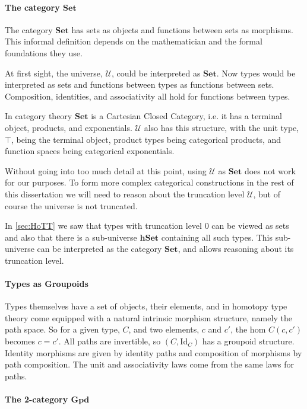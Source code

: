 \documentclass[12pt, parskip, DIV=14]{scrbook}
\newcommand{\hSet}{\mathbf{hSet}}
\newcommand{\Gpd}{\mathbf{Gpd}}
\begin{document}
\paragraph{The category $\mathbf{Set}$}

The category $\mathbf{Set}$ has sets as objects and functions between sets as morphisms. This informal definition depends on the mathematician and the formal foundations they use.

At first sight, the universe, $\mathcal{U}$, could be interpreted as $\mathbf{Set}$. Now types would be interpreted as sets and functions between types as functions between sets. Composition, identities, and associativity all hold for functions between types.

In category theory $\mathbf{Set}$ is a Cartesian Closed Category, i.e. it has a terminal object, products, and exponentials. $\mathcal{U}$ also has this structure, with the unit type, $\top$, being the terminal object, product types being categorical products, and function spaces being categorical exponentials.

Without going into too much detail at this point, using $\mathcal{U}$ as $\mathbf{Set}$ does not work for our purposes. To form more complex categorical constructions in the rest of this dissertation we will need to reason about the truncation level $\mathcal{U}$, but of course the universe is not truncated.

In \cref{sec:HoTT} we saw that types with truncation level $0$ can be viewed as sets and also that there is a sub-universe $\hSet$ containing all such types. This sub-universe can be interpreted as the category $\mathbf{Set}$, and allows reasoning about its truncation level.

\paragraph{Types as Groupoids}

Types themselves have a set of objects, their elements, and in homotopy type theory come equipped with a natural intrinsic morphism structure, namely the path space. So for a given type, $C$, and two elements, $c$ and $c'$, the hom $C(c, c')$ becomes $c = c'$. All paths are invertible, so $(C , \mathrm{Id}_C)$ has a groupoid structure. Identity morphisms are given by identity paths and composition of morphisms by path composition. The unit and associativity laws come from the same laws for paths.

\paragraph{The 2-category $\Gpd$}
\end{document}
